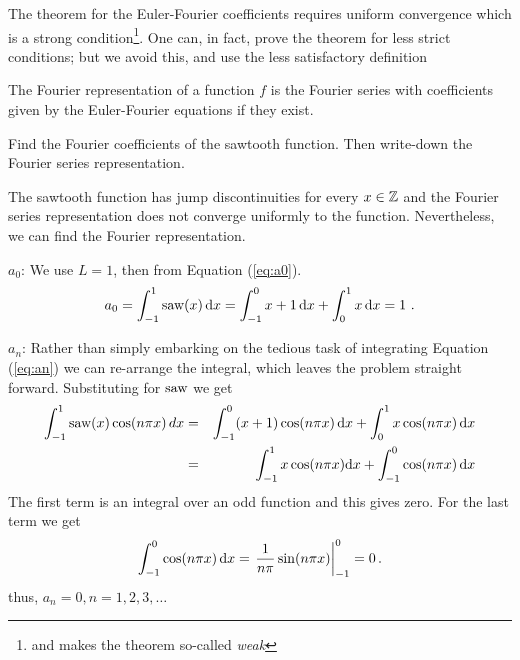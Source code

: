 \noindent The theorem for the Euler-Fourier coefficients requires uniform convergence which is a
strong condition\footnote{and makes the theorem so-called  \emph{weak} }. One
can, in fact, prove the theorem for less strict conditions; but we avoid this, and use the less 
satisfactory definition
\begin{definition}
The Fourier representation of a function $f$ is the Fourier
series with coefficients given by the Euler-Fourier equations if they exist.   
\end{definition}

\begin{example}
	Find the Fourier coefficients of the sawtooth function. Then write-down the Fourier series representation.
	
	\bigskip
	
	\noindent The sawtooth function has jump discontinuities for every $x \in \mathbb{Z}$ and the Fourier series representation
	does not converge uniformly to the function. Nevertheless, we can find the Fourier
	representation.

	\bigskip

	\noindent $a_0$: We use $L=1$, then from Equation (\ref{eq:a0}).
	\begin{equation}
		a_0 = \int_{-1}^1 \text{saw}(x) \, \mathrm{d} x = \int_{-1}^0 x + 1\, \mathrm{d} x + \int_{0}^1 x \, \mathrm{d} x = 1 \ .  
	\end{equation}
	

	\noindent $a_n$: Rather than simply embarking on the tedious task of integrating Equation 
	(\ref{eq:an}) we can re-arrange the integral, which leaves the problem straight forward. 
	Substituting for $\text{saw}$ we get 
	\begin{eqnarray}
		\int_{-1}^1 \text{saw}(x) \cos(n\pi x) \, dx &=& \int_{-1}^0 (x+1) \cos(n\pi x) \, \mathrm{d} x + \int_{0}^1 
			x\cos(n\pi x) \, \mathrm{d} x \nonumber \\
			&=& \int_{-1}^1 x \cos(n\pi x) \mathrm{d} x + \int_{-1}^0 \cos(n \pi x) \, \mathrm{d} x
	\end{eqnarray}
	The first term is an integral over an odd function and this gives zero. For the last 
	term we get 
	\begin{equation}
		 \int_{-1}^0 \cos(n \pi x) \, \mathrm{d} x = \left. \frac{1}{n\pi} \sin (n\pi x)\right|_{-1}^0 = 0 \, .
	\end{equation}
	thus, $a_n=0, n = 1,2,3,\ldots$ 


\end{example}
